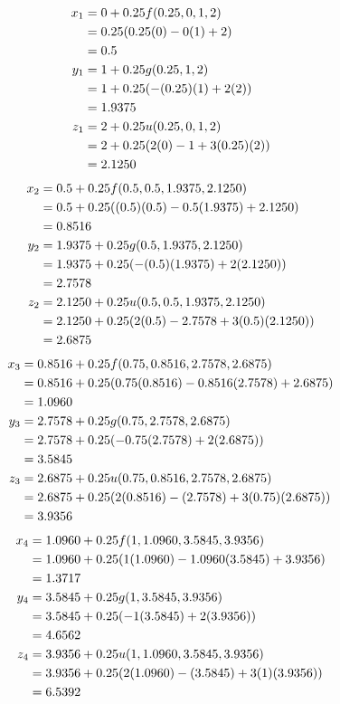 		\begin{align}
			x_{1} &= 0 + 0.25f(0.25,0,1,2)& \notag \\
			&= 0.25(0.25(0) - 0(1) + 2)& \notag \\
			&= 0.5& \\
			y_{1} &= 1 + 0.25g(0.25,1,2)& \notag \\
			&= 1 + 0.25(-(0.25)(1) + 2(2))& \notag \\
			&= 1.9375& \\
			z_{1} &= 2 + 0.25u(0.25,0,1,2)& \notag \\
			&= 2 + 0.25(2(0) - 1 + 3(0.25)(2))& \notag \\
			&= 2.1250&
		\end{align}
		\begin{align}
			x_{2} &= 0.5 + 0.25f(0.5,0.5,1.9375,2.1250)& \notag \\
			&= 0.5 + 0.25((0.5)(0.5) - 0.5(1.9375) + 2.1250)& \notag \\
			&= 0.8516& \\
			y_{2} &= 1.9375 + 0.25g(0.5,1.9375,2.1250)& \notag \\
			&= 1.9375 + 0.25(-(0.5)(1.9375) + 2(2.1250))& \notag \\
			&= 2.7578& \\
			z_{2} &= 2.1250 + 0.25u(0.5,0.5,1.9375,2.1250)& \notag \\
			&= 2.1250 + 0.25(2(0.5) - 2.7578 + 3(0.5)(2.1250))& \notag \\
			&= 2.6875&
		\end{align}
		\begin{align}
			x_{3} &= 0.8516 + 0.25f(0.75,0.8516,2.7578,2.6875)& \notag \\
			&= 0.8516 + 0.25(0.75(0.8516) - 0.8516(2.7578) + 2.6875)& \notag \\
			&= 1.0960& \\
			y_{3} &= 2.7578 + 0.25g(0.75,2.7578,2.6875)& \notag \\
			&= 2.7578 + 0.25(-0.75(2.7578) + 2(2.6875))& \notag \\
			&= 3.5845& \\
			z_{3} &= 2.6875 + 0.25u(0.75,0.8516,2.7578,2.6875)& \notag \\
			&= 2.6875 + 0.25(2(0.8516) - (2.7578) + 3(0.75)(2.6875))& \notag \\
			&= 3.9356&
		\end{align}
		\begin{align}
			x_{4} &= 1.0960 + 0.25f(1,1.0960,3.5845,3.9356)& \notag \\
			&= 1.0960 + 0.25(1(1.0960) - 1.0960(3.5845) + 3.9356)& \notag \\
			&= 1.3717 \\
			y_{4} &= 3.5845 + 0.25g(1,3.5845,3.9356)& \notag \\
			&= 3.5845 + 0.25(-1(3.5845) + 2(3.9356))& \notag \\
			&= 4.6562& \\
			z_{4} &= 3.9356 + 0.25u(1,1.0960,3.5845,3.9356)& \notag \\
			&= 3.9356 + 0.25(2(1.0960) - (3.5845) + 3(1)(3.9356))& \notag \\
			&= 6.5392&
		\end{align}

